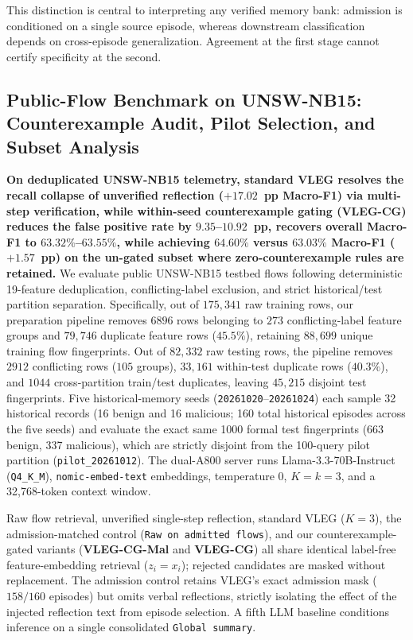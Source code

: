 \documentclass[10pt,a4paper,onecolumn]{article}
\theoremstyle{definition}
\theoremstyle{remark}
\begin{document}
This distinction is central to interpreting any verified memory bank: admission is conditioned on a single source episode, whereas downstream classification depends on cross-episode generalization. Agreement at the first stage cannot certify specificity at the second.

\subsection{Public-Flow Benchmark on UNSW-NB15: Counterexample Audit, Pilot Selection, and Subset Analysis}
\label{sec:exp6}
\textbf{On deduplicated UNSW-NB15 telemetry, standard VLEG resolves the recall collapse of unverified reflection ($+17.02$~pp Macro-F1) via multi-step verification, while within-seed counterexample gating (VLEG-CG) reduces the false positive rate by $9.35$--$10.92$~pp, recovers overall Macro-F1 to $63.32\%$--$63.55\%$, while achieving $64.60\%$ versus $63.03\%$ Macro-F1 ($+1.57$~pp) on the un-gated subset where zero-counterexample rules are retained.} We evaluate public UNSW-NB15 testbed flows \cite{moustafa2015unsw} following deterministic 19-feature deduplication, conflicting-label exclusion, and strict historical/test partition separation. Specifically, out of $175,341$ raw training rows, our preparation pipeline removes $6896$ rows belonging to $273$ conflicting-label feature groups and $79,746$ duplicate feature rows ($45.5\%$), retaining $88,699$ unique training flow fingerprints. Out of $82,332$ raw testing rows, the pipeline removes $2912$ conflicting rows ($105$ groups), $33,161$ within-test duplicate rows ($40.3\%$), and $1044$ cross-partition train/test duplicates, leaving $45,215$ disjoint test fingerprints. Five historical-memory seeds (\texttt{20261020}--\texttt{20261024}) each sample 32 historical records (16 benign and 16 malicious; 160 total historical episodes across the five seeds) and evaluate the exact same 1000 formal test fingerprints (663 benign, 337 malicious), which are strictly disjoint from the 100-query pilot partition (\texttt{pilot\_20261012}). The dual-A800 server runs Llama-3.3-70B-Instruct (\texttt{Q4\_K\_M}), \texttt{nomic-embed-text} embeddings, temperature $0$, $K=k=3$, and a 32,768-token context window.

Raw flow retrieval, unverified single-step reflection, standard VLEG ($K=3$), the admission-matched control (\texttt{Raw on admitted flows}), and our counterexample-gated variants (\textbf{VLEG-CG-Mal} and \textbf{VLEG-CG}) all share identical label-free feature-embedding retrieval ($z_i = x_i$); rejected candidates are masked without replacement. The admission control retains VLEG's exact admission mask ($158/160$ episodes) but omits verbal reflections, strictly isolating the effect of the injected reflection text from episode selection. A fifth LLM baseline conditions inference on a single consolidated \texttt{Global summary}.
\end{document}
